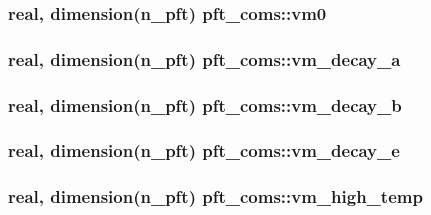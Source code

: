 \subsubsection[{\texorpdfstring{vm0}{vm0}}]{\setlength{\rightskip}{0pt plus 5cm}real, dimension(n\+\_\+pft) pft\+\_\+coms\+::vm0}\hypertarget{namespacepft__coms_a80a6462c48a36d9c1ab7bcf0b6296702}{}\label{namespacepft__coms_a80a6462c48a36d9c1ab7bcf0b6296702}
\subsubsection[{\texorpdfstring{vm\+\_\+decay\+\_\+a}{vm_decay_a}}]{\setlength{\rightskip}{0pt plus 5cm}real, dimension(n\+\_\+pft) pft\+\_\+coms\+::vm\+\_\+decay\+\_\+a}\hypertarget{namespacepft__coms_a2c9cb0165d22f8653900869b77019f4d}{}\label{namespacepft__coms_a2c9cb0165d22f8653900869b77019f4d}
\subsubsection[{\texorpdfstring{vm\+\_\+decay\+\_\+b}{vm_decay_b}}]{\setlength{\rightskip}{0pt plus 5cm}real, dimension(n\+\_\+pft) pft\+\_\+coms\+::vm\+\_\+decay\+\_\+b}\hypertarget{namespacepft__coms_a21f9c00aea9610811aae2469b5070c1b}{}\label{namespacepft__coms_a21f9c00aea9610811aae2469b5070c1b}
\subsubsection[{\texorpdfstring{vm\+\_\+decay\+\_\+e}{vm_decay_e}}]{\setlength{\rightskip}{0pt plus 5cm}real, dimension(n\+\_\+pft) pft\+\_\+coms\+::vm\+\_\+decay\+\_\+e}\hypertarget{namespacepft__coms_a05c121e99b033c3fa874fc7ffd66fad3}{}\label{namespacepft__coms_a05c121e99b033c3fa874fc7ffd66fad3}
\subsubsection[{\texorpdfstring{vm\+\_\+high\+\_\+temp}{vm_high_temp}}]{\setlength{\rightskip}{0pt plus 5cm}real, dimension(n\+\_\+pft) pft\+\_\+coms\+::vm\+\_\+high\+\_\+temp}\hypertarget{namespacepft__coms_a847c455daab9b125944dd2057d418b6c}{}\label{namespacepft__coms_a847c455daab9b125944dd2057d418b6c}

